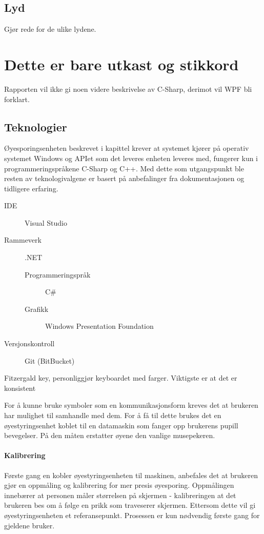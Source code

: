 \documentclass[phd,tocprelim]{cornell}
\begin{document}
\section{Lyd}
    Gjør rede for de ulike lydene.

\chapter{Dette er bare utkast og stikkord}

Rapporten vil ikke gi noen videre beskrivelse av C-Sharp, derimot vil WPF bli forklart.


\section{Teknologier}

Øyesporingsenheten beskrevet i kapittel  krever at systemet kjører på operativ systemet Windows og APIet som det leveres enheten leveres med,  fungerer kun i programmeringspråkene C-Sharp og C++. Med dette som utgangspunkt ble resten av teknologivalgene er basert på anbefalinger fra dokumentasjonen og tidligere erfaring. 


\begin{description}
  \item[IDE] Visual Studio
  \item[Rammeverk] .NET
  \begin{description}
     \item[Programmeringspråk] C\#
     \item[Grafikk] Windows Presentation Foundation 
\end{description}
  \item[Versjonskontroll] Git (BitBucket)
\end{description}


Fitzergald key, personliggjør keyboardet med farger. Viktigste er at det er konsistent


For å kunne bruke symboler som en kommunikasjonsform kreves det at brukeren har mulighet til samhandle med dem. For å få til dette brukes det en øyestyringsenhet koblet til en datamaskin som fanger opp brukerens pupill bevegelser. På den måten erstatter øyene den vanlige musepekeren.

\subsubsection{Kalibrering}


Første gang en kobler øyestyringsenheten til maskinen, anbefales det at brukeren gjør en oppmåling og kalibrering for mer presis øyesporing. Oppmålingen innebærer at personen måler størrelsen på skjermen - kalibreringen at det brukeren bes om å følge en prikk som traveserer skjermen. Ettersom dette vil gi øyestyringsenheten et referansepunkt. Prosessen er kun nødvendig første gang for gjeldene bruker. 
\end{document}
